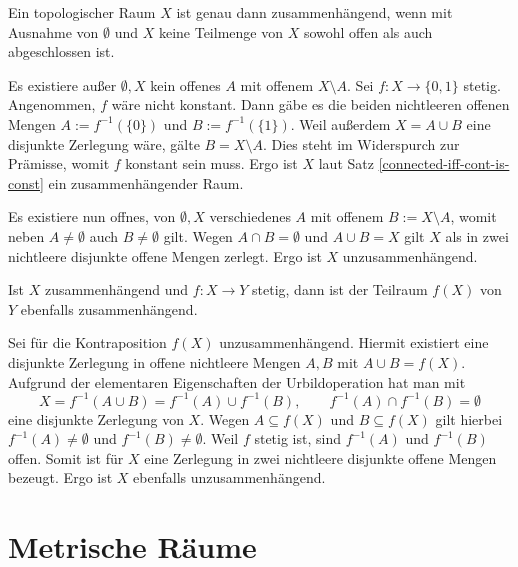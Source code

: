 \newpage
\begin{Satz}
Ein topologischer Raum $X$ ist genau dann zusammenhängend,
wenn mit Ausnahme von $\emptyset$ und $X$ keine Teilmenge
von $X$ sowohl offen als auch abgeschlossen ist.
\end{Satz}
\begin{Beweis}
Es existiere außer $\emptyset,X$ kein offenes $A$ mit offenem
$X\setminus A$. Sei $f\colon X\to\{0,1\}$ stetig. Angenommen, $f$
wäre nicht konstant. Dann gäbe es die beiden nichtleeren offenen Mengen
$A:=f^{-1}(\{0\})$ und $B:=f^{-1}(\{1\})$. Weil außerdem $X=A\cup B$
eine disjunkte Zerlegung wäre, gälte $B=X\setminus A$. Dies steht
im Widerspurch zur Prämisse, womit $f$ konstant sein muss.
Ergo ist $X$ laut Satz \ref{connected-iff-cont-is-const} ein
zusammenhängender Raum.

Es existiere nun offnes, von $\emptyset,X$ verschiedenes $A$ mit
offenem $B:=X\setminus A$, womit neben $A\ne\emptyset$ auch
$B\ne\emptyset$ gilt. Wegen $A\cap B=\emptyset$ und $A\cup B=X$
gilt $X$ als in zwei nichtleere disjunkte offene Mengen zerlegt.
Ergo ist $X$ unzusammenhängend.\,\qedsymbol
\end{Beweis}

\begin{Satz}
Ist $X$ zusammenhängend und $f\colon X\to Y$ stetig, dann
ist der Teilraum $f(X)$ von $Y$ ebenfalls zusammenhängend.
\end{Satz}
\begin{Beweis}
Sei für die Kontraposition $f(X)$ unzusammenhängend. Hiermit existiert
eine disjunkte Zerlegung in offene nichtleere Mengen $A,B$ mit
$A\cup B=f(X)$. Aufgrund der elementaren Eigenschaften der
Urbildoperation hat man mit
\[X = f^{-1}(A\cup B) = f^{-1}(A)\cup f^{-1}(B),\qquad
f^{-1}(A)\cap f^{-1}(B) = \emptyset\]
eine disjunkte Zerlegung von $X$. Wegen $A\subseteq f(X)$ und
$B\subseteq f(X)$ gilt hierbei $f^{-1}(A)\ne\emptyset$ und
$f^{-1}(B)\ne\emptyset$. Weil $f$ stetig ist, sind $f^{-1}(A)$
und $f^{-1}(B)$ offen. Somit ist für $X$ eine Zerlegung
in zwei nichtleere disjunkte offene Mengen bezeugt. Ergo ist
$X$ ebenfalls unzusammenhängend.\,\qedsymbol
\end{Beweis}


\newpage
\section{Metrische Räume}
